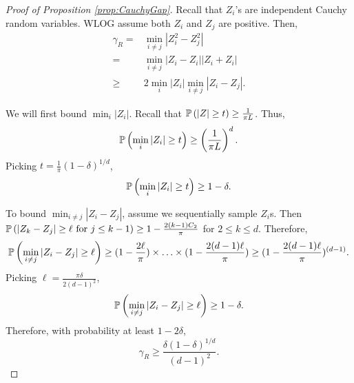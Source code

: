 \begin{proof}[Proof of Proposition \ref{prop:CauchyGap}]
Recall that $Z_i$'s are independent Cauchy random variables.
WLOG assume both $Z_i$ and $Z_j$ are positive. Then, 
\begin{align*}
\gamma_R =	& \min_{i\neq j} \left\vert Z_i^2 - Z_j^2 \right\vert \\
	=		& \min_{i\neq j}\left\vert Z_i - Z_i \right\vert	\left\vert Z_i + Z_i \right\vert \\
	\ge 	& 2\min_i\vert Z_i\vert\min_{i\neq j} \left\vert Z_i - Z_j \right\vert.
\end{align*}

We will first bound $\min_i |Z_i|$. Recall that $\mathbb{P}\left(|Z|\ge t\right) \ge \frac{1}{\pi L}$. Thus,
\[
\mathbb{P}\left(\min_i |Z_i| \ge t\right) \ge \left(\frac{1}{\pi L}\right)^d.
\]
Picking $t = \frac{1}{\pi}(1-\delta)^{1/d}$, 
\[
\mathbb{P}\left(\min_i |Z_i| \ge t\right) \ge 1-\delta.
\]

To bound $\min_{i\neq j} \left\vert Z_i - Z_j \right\vert$, assume we sequentially sample $Z_i$s. 
Then $\mathbb{P}\left( |Z_{k}- Z_j|\ge \ell \text{ for } j\le k-1\right) \ge 1-\frac{2(k-1)C_2}{\pi}$ for $2 \le k\le d$.
Therefore,
\begin{equation}
\label{eq:ProbEZ}
\mathbb{P}\left(\min_{i\neq j} \left\vert Z_i - Z_j \right\vert \ge \ell\right) \ge (1-\frac{2\ell}{\pi})\times \ldots \times (1-\frac{2(d-1)\ell}{\pi}) \ge (1-\frac{2(d-1)\ell}{\pi})^{(d-1)}.
\end{equation}
Picking $\ell = \frac{\pi\delta}{2(d-1)^2}$,
\[
\mathbb{P}\left(\min_{i\neq j} \left\vert Z_i - Z_j \right\vert \ge \ell\right) \ge 1-\delta.
\]
Therefore, with probability at least $1-2\delta$,
\[
\gamma_R \ge \frac{\delta(1-\delta)^{1/d}}{(d-1)^2}.
\]
\end{proof}



